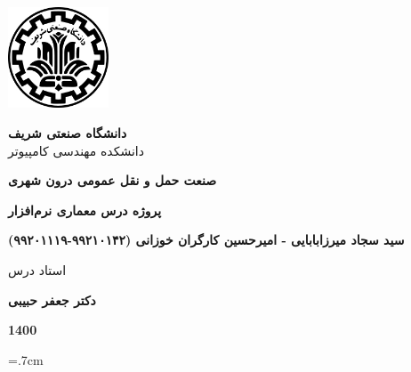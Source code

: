 \thispagestyle{empty}
\begin{center}
\includegraphics[height=3cm]{sut_logo.png}
\vspace{0.4cm}

{\large
	\textbf{دانشگاه صنعتی شریف}\\
	دانشکده مهندسی کامپیوتر
}
\vspace{3.5cm}

{\LARGE
	\textbf{صنعت حمل و نقل عمومی درون شهری}\\
}
\vspace{3.5cm}

{\large
	\textbf{پروژه درس معماری نرم‌افزار}\\
}
\vspace{1cm}

{\Large
	\textbf{سید سجاد میرزابابایی - امیرحسین کارگران خوزانی (٩٩٢١٠١۴٢-۹۹۲۰۱۱۱۹)}\\
}
\vspace{2.5cm}

{\large
	استاد درس\\
}
\vspace{0.5cm}

{\Large
	\textbf{دکتر جعفر حبیبی}\\
}
\vspace{3.5cm}

{\Large
	\textbf{1400}
}

\end{center}
\restoregeometry
\pagebreak

%
%
%	
%


\baselineskip=.7cm

